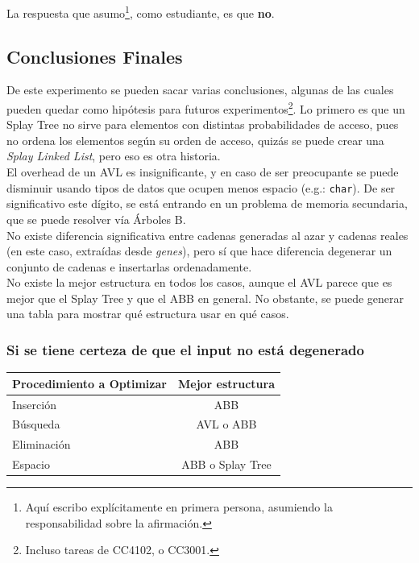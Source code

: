 \documentclass[12pt,letterpaper]{report}
\begin{document}
La respuesta que asumo\footnote{Aquí escribo explícitamente en primera persona, asumiendo la responsabilidad sobre la afirmación.}, como estudiante, es que \textbf{no}.

\subsection{Conclusiones Finales}
\label{subsec:conclusiones}

De este experimento se pueden sacar varias conclusiones, algunas de las cuales pueden quedar como hipótesis para futuros experimentos\footnote{Incluso tareas de CC4102, o CC3001.}. Lo primero es que un Splay Tree no sirve para elementos con distintas probabilidades de acceso, pues no ordena los elementos según su orden de acceso, quizás se puede crear una \emph{Splay Linked List}, pero eso es otra historia.\\

El overhead de un AVL es insignificante, y en caso de ser preocupante se puede disminuir usando tipos de datos que ocupen menos espacio (e.g.: \texttt{char}). De ser significativo este dígito, se está entrando en un problema de memoria secundaria, que se puede resolver vía Árboles B.\\

No existe diferencia significativa entre cadenas generadas al azar y cadenas reales (en este caso, extraídas desde \emph{genes}), pero sí que hace diferencia degenerar un conjunto de cadenas e insertarlas ordenadamente.\\

No existe la mejor estructura en todos los casos, aunque el AVL parece que es mejor que el Splay Tree y que el ABB en general. No obstante, se puede generar una tabla para mostrar qué estructura usar en qué casos.

\subsubsection{Si se tiene certeza de que el input no está degenerado}
\begin{center}
  \begin{tabular}{|l|c|}
    \hline
    Procedimiento a Optimizar & Mejor estructura \\ \hline
    Inserción & ABB \\ \hline
    Búsqueda & AVL o ABB \\ \hline
    Eliminación & ABB \\ \hline
    Espacio & ABB o Splay Tree \\ \hline
  \end{tabular}
\end{center}
\end{document}
